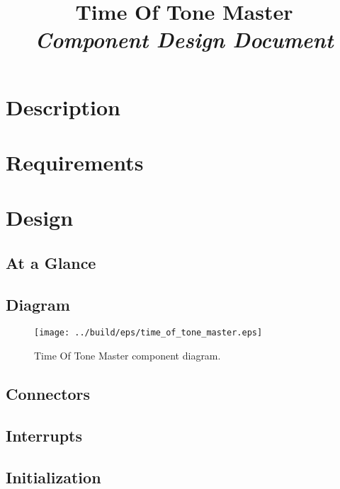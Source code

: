 



\title{\textbf{Time Of Tone Master} \\
\large\textit{Component Design Document}}
\date{}
\maketitle

\section{Description}


\section{Requirements}


\section{Design}

\subsection{At a Glance}


\subsection{Diagram}
\begin{figure}[H]
  \texttt{[image: ../build/eps/time\_of\_tone\_master.eps]}
  \caption{Time Of Tone Master component diagram.}
\end{figure}

\subsection{Connectors}


\subsection{Interrupts}



\subsection{Initialization}


